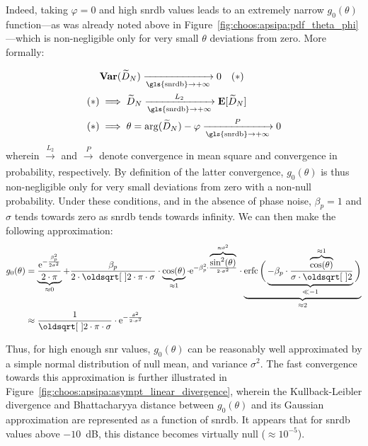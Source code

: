 Indeed, taking $\varphi=0$ and high \gls{snrdb} values leads to an extremely narrow $g_0(\theta)$ function---as was already noted above in Figure~\ref{fig:choos:apsipa:pdf_theta_phi}---which is non-negligible only for very small $\theta$ deviations from zero. More formally:

\begin{equation}
	\begin{aligned}
		&\var (\widetilde{D}_N) \xrightarrow[\text{\gls{snrdb}}\rightarrow + \infty]{} 0\quad(*)\\
		(*) &\implies \widetilde{D}_N \xrightarrow[\text{\gls{snrdb}}\rightarrow + \infty]{L_2} \esp [ \widetilde{D}_N ]\\
		(*) &\implies \theta = \arg (\widetilde{D}_N) - \varphi \xrightarrow[\text{\gls{snrdb}}\rightarrow + \infty]{P} 0
	\end{aligned}
\end{equation}
wherein $\xrightarrow[]{L_2}$ and $\xrightarrow[]{P}$ denote convergence in mean square and convergence in probability, respectively. By definition of the latter convergence, $g_0(\theta)$ is thus non-negligible only for very small deviations from zero with a non-null probability. Under these conditions, and in the absence of phase noise, $\beta_p = 1$ and $\sigma$ tends towards zero as \gls{snrdb} tends towards infinity. We can then make the following approximation:
\begin{equation}\label{eq:choos:apsipa:approx_gaussian}
	\begin{aligned}
		g_0(\theta) &= \underbrace{\frac{\e^{-\frac{\beta_p^2}{2 \sigma^2}}}{2\cdot \pi}}_{\approx 0} + \frac{\beta_p}{2 \cdot \sqrt{2 \cdot \pi} \cdot \sigma} \cdot \underbrace{\cos(\theta)}_{\approx 1} \cdot \e^{-\beta_p^2 \cdot \frac{\overbrace{\sin^2(\theta)}^{\approx \theta^2}}{2\cdot \sigma^2}} \cdot \underbrace{\erfc\bigg(\underbrace{- \beta_p \cdot \frac{\overbrace{\cos(\theta)}^{\approx 1}}{\sigma \cdot \sqrt{2}}}_{\ll -1}\bigg)}_{\approx 2}\\
		&\approx \frac{1}{\sqrt{2 \cdot \pi} \cdot 	\sigma} \cdot \e^{-\frac{\theta^2}{2\cdot \sigma^2}}
	\end{aligned}
\end{equation}

Thus, for high enough \gls{snr} values, $g_0(\theta)$ can be reasonably well approximated by a simple normal distribution of null mean, and variance $\sigma^2$. The fast convergence towards this approximation is further illustrated in Figure~\ref{fig:choos:apsipa:asympt_linear_divergence}, wherein the Kullback-Leibler divergence and Bhattacharyya distance between $g_0(\theta)$ and its Gaussian approximation are represented as a function of \gls{snrdb}. It appears that for \gls{snrdb} values above $-10$~dB, this distance becomes virtually null ($\approx 10^{-5}$).

